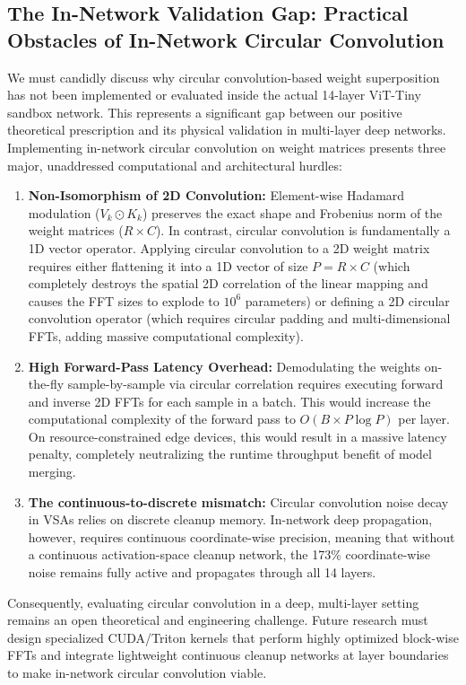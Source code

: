 \documentclass{article}
\theoremstyle{plain}
\theoremstyle{definition}
\theoremstyle{remark}
\begin{document}
\subsection{The In-Network Validation Gap: Practical Obstacles of In-Network Circular Convolution}
We must candidly discuss why circular convolution-based weight superposition has not been implemented or evaluated inside the actual 14-layer ViT-Tiny sandbox network. This represents a significant gap between our positive theoretical prescription and its physical validation in multi-layer deep networks. Implementing in-network circular convolution on weight matrices presents three major, unaddressed computational and architectural hurdles:
\begin{enumerate}
\item \textbf{Non-Isomorphism of 2D Convolution:} Element-wise Hadamard modulation ($V_k \odot K_k$) preserves the exact shape and Frobenius norm of the weight matrices ($R \times C$). In contrast, circular convolution is fundamentally a 1D vector operator. Applying circular convolution to a 2D weight matrix requires either flattening it into a 1D vector of size $P = R \times C$ (which completely destroys the spatial 2D correlation of the linear mapping and causes the FFT sizes to explode to $10^6$ parameters) or defining a 2D circular convolution operator (which requires circular padding and multi-dimensional FFTs, adding massive computational complexity).
\item \textbf{High Forward-Pass Latency Overhead:} Demodulating the weights on-the-fly sample-by-sample via circular correlation requires executing forward and inverse 2D FFTs for each sample in a batch. This would increase the computational complexity of the forward pass to $O(B \times P \log P)$ per layer. On resource-constrained edge devices, this would result in a massive latency penalty, completely neutralizing the runtime throughput benefit of model merging.
\item \textbf{The continuous-to-discrete mismatch:} Circular convolution noise decay in VSAs relies on discrete cleanup memory. In-network deep propagation, however, requires continuous coordinate-wise precision, meaning that without a continuous activation-space cleanup network, the 173\% coordinate-wise noise remains fully active and propagates through all 14 layers.
\end{enumerate}
Consequently, evaluating circular convolution in a deep, multi-layer setting remains an open theoretical and engineering challenge. Future research must design specialized CUDA/Triton kernels that perform highly optimized block-wise FFTs and integrate lightweight continuous cleanup networks at layer boundaries to make in-network circular convolution viable.
\end{document}

